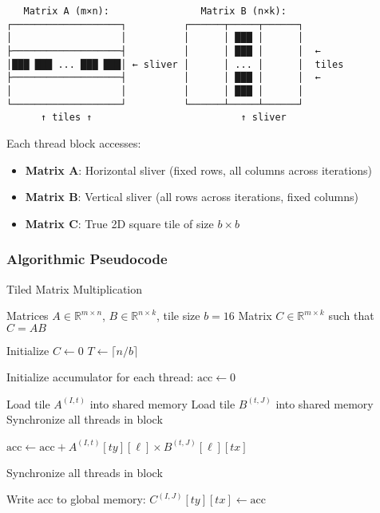 \documentclass{amsbook}
\theoremstyle{definition}
\begin{document}
\begin{center}
    \begin{verbatim}
   Matrix A (m×n):                Matrix B (n×k):
┌───────────────────┐          ┌──────┬─────┬──────┐
│                   │          │      │ ███ │      │
├───────────────────┤          │      │ ███ │      │  ←
│███ ███ ... ███ ███│ ← sliver │      │ ... │      │  tiles
├───────────────────┤          │      │ ███ │      │  ←
│                   │          │      │ ███ │      │
└───────────────────┘          └──────┴─────┴──────┘
      ↑ tiles ↑                          ↑ sliver
    \end{verbatim}
\end{center}

Each thread block accesses:
\begin{itemize}
\item \textbf{Matrix A}: Horizontal sliver (fixed rows, all columns across iterations)
\item \textbf{Matrix B}: Vertical sliver (all rows across iterations, fixed columns)
\item \textbf{Matrix C}: True 2D square tile of size $b \times b$
\end{itemize}

\subsubsection{Algorithmic Pseudocode}

\begin{algorithm}
\caption{Tiled Matrix Multiplication}
\begin{algorithmic}[1]
\Require Matrices $A \in \mathbb{R}^{m \times n}$, $B \in \mathbb{R}^{n \times k}$, tile size $b = 16$
\Ensure Matrix $C \in \mathbb{R}^{m \times k}$ such that $C = AB$

\State Initialize $C \leftarrow 0$
\State $T \leftarrow \lceil n/b \rceil$

    \State Initialize accumulator for each thread: $\text{acc} \leftarrow 0$

        \State Load tile $A^{(I,t)}$ into shared memory
        \State Load tile $B^{(t,J)}$ into shared memory
        \State Synchronize all threads in block

            \State $\text{acc} \leftarrow \text{acc} + A^{(I,t)}[ty][\ell] \times B^{(t,J)}[\ell][tx]$
        \EndFor

        \State Synchronize all threads in block
    \EndFor

    \State Write $\text{acc}$ to global memory: $C^{(I,J)}[ty][tx] \leftarrow \text{acc}$
\EndFor
\end{algorithmic}
\end{algorithm}
\end{document}
